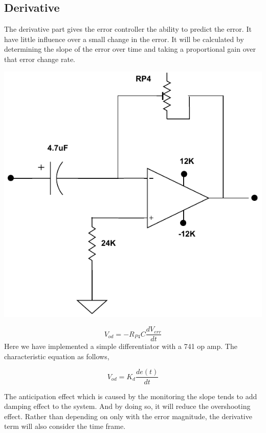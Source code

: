 \begin{multicols}{2}
\subsection{Derivative}
The derivative part gives the error controller the ability to predict the error. It have little influence over a small change in the error. It will be  calculated by determining the slope of the error over time and taking a proportional gain over that error change rate.
\begin{minipage}{0.45\textwidth}
\centering
\includegraphics[width=\textwidth]{PID/D.pdf}
\end{minipage}

$$V_{od}=- R_{P4} C \frac{d V_{err}}{d t}$$
Here we have implemented a simple differentiator with a 741 op amp. The characteristic equation as follows,

$$V_{od}=K_d \frac{d e(t)}{d t}$$

The anticipation effect which is caused by the monitoring the slope tends to add damping effect to the system. And by doing so, it will reduce the overshooting effect. Rather than depending on only with the error magnitude, the derivative term will also consider the time frame.


\end{multicols}
